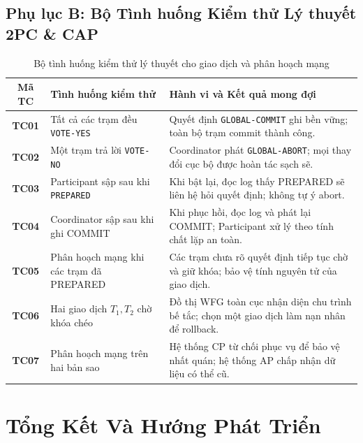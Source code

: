 \documentclass[12pt,a4paper]{report}
\begin{document}
\newpage
\section*{Phụ lục B: Bộ Tình huống Kiểm thử Lý thuyết 2PC \& CAP}

\begin{table}[!ht]
\centering
\small
\caption{Bộ tình huống kiểm thử lý thuyết cho giao dịch và phân hoạch mạng}
\label{tab:test_cases}
\renewcommand{\arraystretch}{1.25}
\begin{tabularx}{\textwidth}{|c|>{\raggedright\arraybackslash}p{4cm}|>{\raggedright\arraybackslash}X|}
\hline
\textbf{Mã TC} & \textbf{Tình huống kiểm thử} & \textbf{Hành vi và Kết quả mong đợi} \\ \hline
\textbf{TC01} & Tất cả các trạm đều \texttt{VOTE-YES} & Quyết định \texttt{GLOBAL-COMMIT} ghi bền vững; toàn bộ trạm commit thành công. \\ \hline
\textbf{TC02} & Một trạm trả lời \texttt{VOTE-NO} & Coordinator phát \texttt{GLOBAL-ABORT}; mọi thay đổi cục bộ được hoàn tác sạch sẽ. \\ \hline
\textbf{TC03} & Participant sập sau khi \texttt{PREPARED} & Khi bật lại, đọc log thấy PREPARED sẽ liên hệ hỏi quyết định; không tự ý abort. \\ \hline
\textbf{TC04} & Coordinator sập sau khi ghi COMMIT & Khi phục hồi, đọc log và phát lại COMMIT; Participant xử lý theo tính chất lặp an toàn. \\ \hline
\textbf{TC05} & Phân hoạch mạng khi các trạm đã PREPARED & Các trạm chưa rõ quyết định tiếp tục chờ và giữ khóa; bảo vệ tính nguyên tử của giao dịch. \\ \hline
\textbf{TC06} & Hai giao dịch $T_1, T_2$ chờ khóa chéo & Đồ thị WFG toàn cục nhận diện chu trình bế tắc; chọn một giao dịch làm nạn nhân để rollback. \\ \hline
\textbf{TC07} & Phân hoạch mạng trên hai bản sao & Hệ thống CP từ chối phục vụ để bảo vệ nhất quán; hệ thống AP chấp nhận dữ liệu có thể cũ. \\ \hline
\end{tabularx}
\end{table}

\chapter{Tổng Kết Và Hướng Phát Triển}
\end{document}
